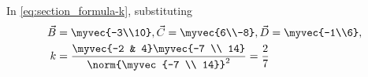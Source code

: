 \iffalse
Using section formula,
\begin{align}
         \myvec{-1\\6} &=\frac{{\myvec{-3\\10}+k\myvec{6\\-8}}}{1+k}\\
	 \implies 7k\myvec{1 \\ -2} &= 2\myvec{1 \\ -2}
	 \\
	 \text{or, } k &= \frac{2}{7}.
\end{align}
\fi
In 
			\eqref{eq:section_formula-k}, substituting
			\begin{align}
				\vec{B} &= \myvec{-3\\10}, \vec{C} = \myvec{6\\-8}, \vec{D} = \myvec{-1\\6},
				\\
				k &= \frac{\myvec{-2 & 4}\myvec{-7 \\ 14}}{\norm{\myvec{-7 \\ 14}}^2} = \frac{2}{7}
			\end{align}
\iffalse
See \figref{fig:10/7/2/4Fig1}.
\begin{figure}[H]
 \begin{center}
  \texttt{[image: chapters/10/7/2/4/figs/fig.png]}
 \end{center}
\caption{}
\label{fig:10/7/2/4Fig1}
\end{figure}
\fi
